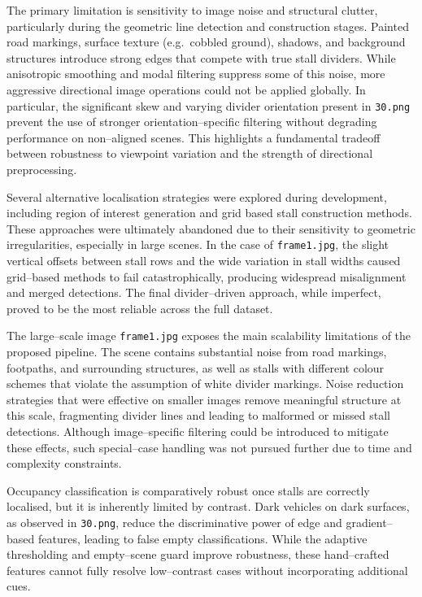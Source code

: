 \documentclass[9pt,journal]{IEEEtran}
\begin{document}
	The primary limitation is sensitivity to image noise and structural clutter, particularly during the geometric line detection and construction stages. Painted road markings, surface texture (e.g.\ cobbled ground), shadows, and background structures introduce strong edges that compete with true stall dividers. While anisotropic smoothing and modal filtering suppress some of this noise, more aggressive directional image operations could not be applied globally. In particular, the significant skew and varying divider orientation present in \texttt{30.png} prevent the use of stronger orientation--specific filtering without degrading performance on non--aligned scenes. This highlights a fundamental tradeoff between robustness to viewpoint variation and the strength of directional preprocessing.
	
	Several alternative localisation strategies were explored during development, including region of interest generation and grid based stall construction methods. These approaches were ultimately abandoned due to their sensitivity to geometric irregularities, especially in large scenes. In the case of \texttt{frame1.jpg}, the slight vertical offsets between stall rows and the wide variation in stall widths caused grid--based methods to fail catastrophically, producing widespread misalignment and merged detections. The final divider--driven approach, while imperfect, proved to be the most reliable across the full dataset.
	
	The large--scale image \texttt{frame1.jpg} exposes the main scalability limitations of the proposed pipeline. The scene contains substantial noise from road markings, footpaths, and surrounding structures, as well as stalls with different colour schemes that violate the assumption of white divider markings. Noise reduction strategies that were effective on smaller images remove meaningful structure at this scale, fragmenting divider lines and leading to malformed or missed stall detections. Although image--specific filtering could be introduced to mitigate these effects, such special--case handling was not pursued further due to time and complexity constraints.
	
	Occupancy classification is comparatively robust once stalls are correctly localised, but it is inherently limited by contrast. Dark vehicles on dark surfaces, as observed in \texttt{30.png}, reduce the discriminative power of edge and gradient--based features, leading to false empty classifications. While the adaptive thresholding and empty--scene guard improve robustness, these hand--crafted features cannot fully resolve low--contrast cases without incorporating additional cues.
	
\end{document}
